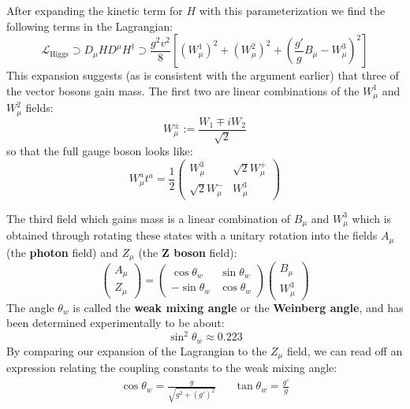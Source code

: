 \documentclass[11pt, oneside]{article}   	%
\theoremstyle{definition}
\numberwithin{equation}{subsection}		%
\begin{document}
After expanding the kinetic term for $H$ with this parameterization we find the following terms in the Lagrangian:
\begin{equation}
	\mathcal L_\mathrm{Higgs}\supset D_\mu H D^\mu H^\dagger \supset \frac{g^2 v^2}{8} \left[\left(W_\mu^1\right)^2 + 
	\left(W_\mu^2\right)^2 + \left(\frac{g'}{g} B_\mu - W_\mu^3\right)^2\right]
\end{equation}
This expansion suggests (as is consistent with the argument earlier) that three of the vector bosons gain mass. The first 
two are linear combinations of the $W_\mu^1$ and $W_\mu^2$ fields:
\begin{equation}
	W_\mu^\pm := \frac{W_1 \mp i W_2}{\sqrt 2}
\end{equation}
so that the full gauge boson looks like:
\begin{equation}
	W_\mu^a t^a = \frac{1}{2} \begin{pmatrix} W_\mu^3 & \sqrt 2 W_\mu^+ \\
	\sqrt 2 W_\mu^- & W_\mu^3 \end{pmatrix}
\end{equation}

The third field which gains mass is a linear combination of $B_\mu$ and $W_\mu^3$ which is obtained through rotating 
these states with a unitary rotation into the fields $A_\mu$ (the \textbf{photon} field) and $Z_\mu$ (the \textbf{Z boson} field):
\begin{equation}
	\begin{pmatrix} A_\mu \\ Z_\mu \end{pmatrix} = 
	\begin{pmatrix} 
		\cos\theta_w & \sin\theta_w \\
		-\sin\theta_w & \cos\theta_w
	\end{pmatrix}
	\begin{pmatrix} B_\mu \\ W_\mu^3\end{pmatrix}
\end{equation}
The angle $\theta_w$ is called the \textbf{weak mixing angle} or the \textbf{Weinberg angle}, and has been determined 
experimentally to be about:
\begin{equation}
	\sin^2\theta_w \approx 0.223
\end{equation}
By comparing our expansion of the Lagrangian to the $Z_\mu$ field, we can read off an expression relating the coupling 
constants to the weak mixing angle:
\begin{align}
	\cos\theta_w = \frac{g}{\sqrt{g^2 + (g')^2}} && \tan\theta_w = \frac{g'}{g}
\end{align}
\end{document}
